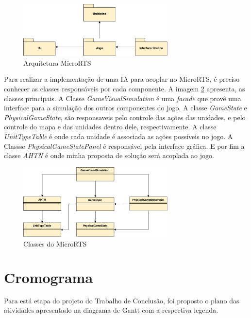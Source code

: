  \begin{figure}[ht]
 	\centering
 	\includegraphics[width=0.7\textwidth]{fig/pacotes.pdf}
 	\caption{Arquitetura MicroRTS}
 	\label{fig:pacotes}
 \end{figure} 
 
 
Para realizar a implementação de uma IA para acoplar no MicroRTS, é preciso conhecer as classes responsáveis por cada componente. A imagem \ref{fig:classes} apresenta, as classes principais. A Classe \textit{GameVisualSimulation} é uma \textit{facade} que provê uma interface para a simulação dos outros componentes do jogo. A classe \textit{GameState} e \textit{PhysicalGameState}, são responsaveis pelo controle das ações das unidades, e pelo controle do mapa e das unidades dentro dele, respectivamente. A classe \textit{UnitTypeTable} é onde cada unidade é associada as ações possíveis no jogo. A Classse \textit{PhysicalGameStatePanel} é responsável pela interface gráfica. E por fim a classe \textit{AHTN} é onde minha proposta de solução será acoplada ao jogo.
 
  \begin{figure}[ht]
  	\centering
  	\includegraphics[width=0.7\textwidth]{fig/classes.pdf}
  	\caption{Classes do MicroRTS}
  	\label{fig:classes}
  \end{figure} 


\section{Cromograma}

Para está etapa do projeto do Trabalho de Conclusão, foi proposto o plano das atividades apresentado na diagrama de Gantt com a respectiva legenda.

